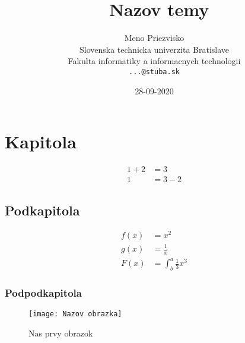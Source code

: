 \documentclass[oneside,a4paper,12pt]{article}  %
\title  {\ Nazov temy}  %
\date {28-09-2020}  %
\author{Meno Priezvisko\\[2pt]   %
                    {\small Slovenska technicka univerzita Bratislave}\\
                    {\small Fakulta informatiky a informacnych technologii}\\
                    {\small \texttt{...@stuba.sk}}
            }
\begin{document}
 

          \maketitle  %
          \newpage  %
                            
 
\section{Kapitola}

          \begin{align*}  %
                    1 + 2 &= 3\\   %
                    1 &= 3 - 2                
          \end{align*}  %


\subsection{Podkapitola}

          \begin{align*}
                    f(x) &= x^2\\
                    g(x) &= \frac{1}{x}\\
                    F(x) &= \int^a_b \frac{1}{3}x^3
          \end{align*}


\subsubsection{Podpodkapitola}

          \begin{figure}[htbp]  %

                    \centering  %
                    \texttt{[image: Nazov obrazka]}  %
                    \caption{Nas prvy obrazok}  %

          \end{figure}  %
\end{document}
